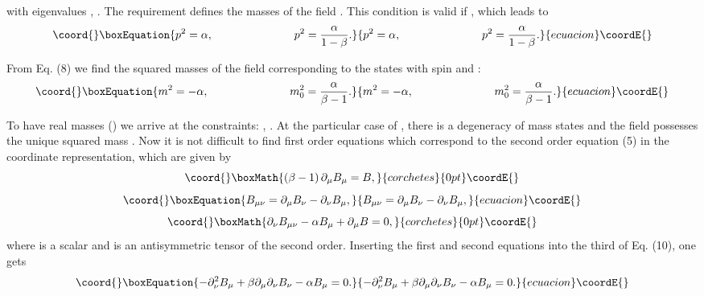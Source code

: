 \documentclass[a4paper,12pt]{article}
\begin{document}
with eigenvalues \coordHE{} , \coordHE{}. The requirement \coordHE{} defines
the masses of the field \coordHE{}. This condition is valid if
\coordHE{}, which leads to
\begin{equation}\coord{}\boxEquation{
p^2=\alpha,\hspace{1.0in}p^2=\frac{\alpha }{1-\beta }. \label{8}
}{
p^2=\alpha,\hspace{1.0in}p^2=\frac{\alpha }{1-\beta }. }{ecuacion}\coordE{}\end{equation}

From Eq. (8) we find the squared masses of the field \coordHE{}
corresponding to the states with spin \coordHE{} and \coordHE{}:
\begin{equation}\coord{}\boxEquation{
m^2=-\alpha,\hspace{1.0in}m_0^2=\frac{\alpha }{\beta -1}.
\label{9}
}{
m^2=-\alpha,\hspace{1.0in}m_0^2=\frac{\alpha }{\beta -1}.
}{ecuacion}\coordE{}\end{equation}

To have real masses (\coordHE{}) we arrive at the constraints:
\coordHE{}, \coordHE{}. At the particular case of \coordHE{},
there is a degeneracy of mass states and the field \coordHE{}
possesses the unique squared mass \coordHE{}. Now it is not
difficult to find first order equations which correspond to the
second order equation (5) in the coordinate representation, which
are given by
\[\coord{}\boxMath{
\left( \beta -1\right) \partial _\mu B_\mu =B,
}{corchetes}{0pt}\coordE{}\]
\begin{equation}\coord{}\boxEquation{
B_{\mu \nu }=\partial _\mu B_\nu -\partial _\nu B_\mu, \label{10}
}{
B_{\mu \nu }=\partial _\mu B_\nu -\partial _\nu B_\mu, }{ecuacion}\coordE{}\end{equation}
\[\coord{}\boxMath{
\partial _\nu B_{\mu \nu }-\alpha B_\mu +\partial _\mu B=0,
}{corchetes}{0pt}\coordE{}\]
where \coordHE{} is a scalar and \coordHE{} is an antisymmetric
tensor of the second order. Inserting the first and second
equations into the third of Eq. (10), one gets
\begin{equation}\coord{}\boxEquation{
-\partial _\nu ^2B_\mu +\beta \partial _\mu \partial _\nu B_\nu
-\alpha B_\mu =0.  \label{11}
}{
-\partial _\nu ^2B_\mu +\beta \partial _\mu \partial _\nu B_\nu
-\alpha B_\mu =0.  }{ecuacion}\coordE{}\end{equation}
\end{document}
